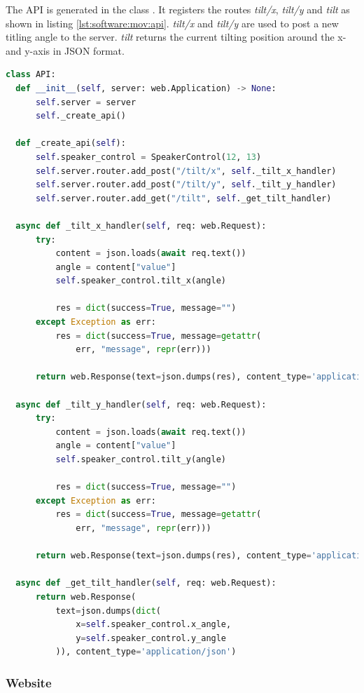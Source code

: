 The API is generated in the class . It registers the routes \textit{tilt/x}, \textit{tilt/y} and \textit{tilt} as shown in listing \ref{lst:software:mov:api}.
\textit{tilt/x} and \textit{tilt/y} are used to post a new titling angle to the server. \textit{tilt} returns the current tilting position around the x- and y-axis in JSON format.
%
\begin{mdframed}
\begin{lstlisting}[language=Python, caption=Control interface API, label=lst:software:mov:api]
class API:
  def __init__(self, server: web.Application) -> None:
      self.server = server
      self._create_api()

  def _create_api(self):
      self.speaker_control = SpeakerControl(12, 13)
      self.server.router.add_post("/tilt/x", self._tilt_x_handler)
      self.server.router.add_post("/tilt/y", self._tilt_y_handler)
      self.server.router.add_get("/tilt", self._get_tilt_handler)

  async def _tilt_x_handler(self, req: web.Request):
      try:
          content = json.loads(await req.text())
          angle = content["value"]
          self.speaker_control.tilt_x(angle)

          res = dict(success=True, message="")
      except Exception as err:
          res = dict(success=True, message=getattr(
              err, "message", repr(err)))

      return web.Response(text=json.dumps(res), content_type='application/json')

  async def _tilt_y_handler(self, req: web.Request):
      try:
          content = json.loads(await req.text())
          angle = content["value"]
          self.speaker_control.tilt_y(angle)

          res = dict(success=True, message="")
      except Exception as err:
          res = dict(success=True, message=getattr(
              err, "message", repr(err)))

      return web.Response(text=json.dumps(res), content_type='application/json')

  async def _get_tilt_handler(self, req: web.Request):
      return web.Response(
          text=json.dumps(dict(
              x=self.speaker_control.x_angle,
              y=self.speaker_control.y_angle
          )), content_type='application/json')
\end{lstlisting}
\end{mdframed}

\subsubsection*{Website}

